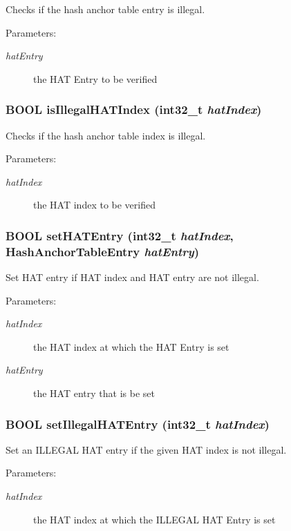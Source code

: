 Checks if the hash anchor table entry is illegal. \begin{Desc}
\item[Parameters:]
\begin{description}
\item[{\em hatEntry}]the HAT Entry to be verified \end{description}
\end{Desc}
\hypertarget{group___v_m_m___h_a_t_g310fed144216406f0affe436c1231342}{
\subsubsection[{isIllegalHATIndex}]{\setlength{\rightskip}{0pt plus 5cm}BOOL isIllegalHATIndex (int32\_\-t {\em hatIndex})}}
\label{group___v_m_m___h_a_t_g310fed144216406f0affe436c1231342}


Checks if the hash anchor table index is illegal. \begin{Desc}
\item[Parameters:]
\begin{description}
\item[{\em hatIndex}]the HAT index to be verified \end{description}
\end{Desc}
\hypertarget{group___v_m_m___h_a_t_g04b252b48624d628fb9679afac037553}{
\subsubsection[{setHATEntry}]{\setlength{\rightskip}{0pt plus 5cm}BOOL setHATEntry (int32\_\-t {\em hatIndex}, \/  {\bf HashAnchorTableEntry} {\em hatEntry})}}
\label{group___v_m_m___h_a_t_g04b252b48624d628fb9679afac037553}


Set HAT entry if HAT index and HAT entry are not illegal. \begin{Desc}
\item[Parameters:]
\begin{description}
\item[{\em hatIndex}]the HAT index at which the HAT Entry is set \item[{\em hatEntry}]the HAT entry that is be set \end{description}
\end{Desc}
\hypertarget{group___v_m_m___h_a_t_g65d55af720a6e86ea7018e5455047269}{
\subsubsection[{setIllegalHATEntry}]{\setlength{\rightskip}{0pt plus 5cm}BOOL setIllegalHATEntry (int32\_\-t {\em hatIndex})}}
\label{group___v_m_m___h_a_t_g65d55af720a6e86ea7018e5455047269}


Set an ILLEGAL HAT entry if the given HAT index is not illegal. \begin{Desc}
\item[Parameters:]
\begin{description}
\item[{\em hatIndex}]the HAT index at which the ILLEGAL HAT Entry is set \end{description}
\end{Desc}
